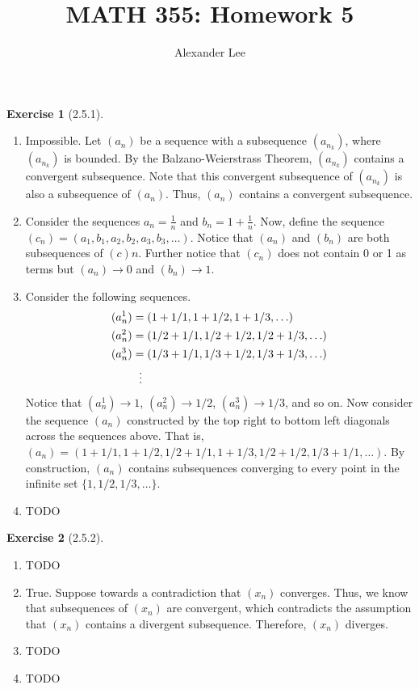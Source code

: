 \documentclass{amsart}
\title{MATH 355: Homework 5}
\author{Alexander Lee}
\theoremstyle{definition}
\newtheorem{exercise}{Exercise}
\begin{document}
\maketitle

\begin{exercise}[2.5.1]
  \begin{enumerate}[label={(\alph*)}]
    \item Impossible. Let $(a_n)$ be a sequence with a subsequence $(a_{n_k})$,
      where $(a_{n_k})$ is bounded. By the Balzano-Weierstrass Theorem,
      $(a_{n_k})$ contains a convergent subsequence. Note that this convergent
      subsequence of $(a_{n_k})$ is also a subsequence of $(a_n)$. Thus, $(a_n)$
      contains a convergent subsequence.
    \item Consider the sequences $a_n = \frac{1}{n}$ and $b_n = 1 +
      \frac{1}{n}$. Now, define the sequence $(c_n) = (a_1, b_1, a_2, b_2, a_3,
      b_3, \ldots)$. Notice that $(a_n)$ and $(b_n)$ are both subsequences of
      $(c)n$. Further notice that $(c_n)$ does not contain 0 or 1 as terms but
      $(a_n) \rightarrow 0$ and $(b_n) \rightarrow 1$.
    \item Consider the following sequences.
      \begin{align*}
        (a^1_n) &= (1 + 1/1, 1 + 1/2, 1 + 1/3, \ldots) \\
        (a^2_n) &= (1/2 + 1/1, 1/2 + 1/2, 1/2 + 1/3, \ldots) \\
        (a^3_n) &= (1/3 + 1/1, 1/3 + 1/2, 1/3 + 1/3, \ldots) \\
        &\vdotswithin{\dots}
      \end{align*}
      Notice that $(a^1_n) \rightarrow 1$, $(a^2_n) \rightarrow 1/2$, $(a^3_n)
      \rightarrow 1/3$, and so on. Now consider the sequence $(a_n)$ constructed
      by the top right to bottom left diagonals across the sequences above. That
      is, $(a_n) = (1 + 1/1, 1 + 1/2, 1/2 + 1/1, 1 + 1/3, 1/2 + 1/2, 1/3 + 1/1,
      \ldots)$. By construction, $(a_n)$ contains subsequences converging to
      every point in the infinite set $\{1, 1/2, 1/3, \ldots\}$.
    \item TODO
  \end{enumerate}
\end{exercise}

\begin{exercise}[2.5.2]
  \begin{enumerate}[label={(\alph*)}]
    \item TODO %
    \item True. Suppose towards a contradiction that $(x_n)$ converges. Thus, we
      know that subsequences of $(x_n)$ are convergent, which contradicts the
      assumption that $(x_n)$ contains a divergent subsequence. Therefore,
      $(x_n)$ diverges.
    \item TODO
    \item TODO
  \end{enumerate}
\end{exercise}
\end{document}

